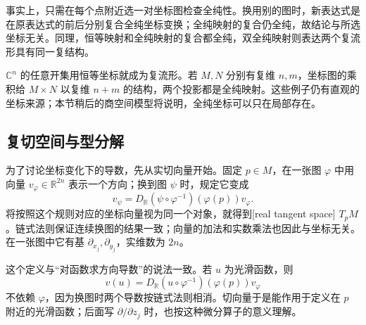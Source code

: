 事实上，只需在每个点附近选一对坐标图检查全纯性。换用别的图时，新表达式是在原表达式的前后分别复合全纯坐标变换；全纯映射的复合仍全纯，故结论与所选坐标无关。同理，恒等映射和全纯映射的复合都全纯，双全纯映射则表达两个复流形具有同一复结构。

\ProseParagraphBreak

\(\mathbb C^n\) 的任意开集用恒等坐标就成为复流形。若 \(M,N\) 分别有复维 \(n,m\)，坐标图的乘积给 \(M\times N\) 以复维 \(n+m\) 的结构，两个投影都是全纯映射。这些例子仍有直观的坐标来源；本节稍后的商空间模型将说明，全纯坐标可以只在局部存在。

\subsection{复切空间与型分解}
\label{b3:subsec:290702}

为了讨论坐标变化下的导数，先从实切向量开始。固定 \(p\in M\)，在一张图 \(\varphi\) 中用向量 \(v_\varphi\in\mathbb R^{2n}\) 表示一个方向；换到图 \(\psi\) 时，规定它变成
\[
 v_\psi=D_{\mathbb R}(\psi\circ\varphi^{-1})(\varphi(p))v_\varphi.
\]
将按照这个规则对应的坐标向量视为同一个对象，就得到[real tangent space] \(T_pM\)。链式法则保证连续换图的结果一致；向量的加法和实数乘法也因此与坐标无关。在一张图中它有基 \(\partial_{x_j},\partial_{y_j}\)，实维数为 \(2n\)。

\ProseParagraphBreak

这个定义与“对函数求方向导数”的说法一致。若 \(u\) 为光滑函数，则
\[
 v(u)=D_{\mathbb R}(u\circ\varphi^{-1})(\varphi(p))v_\varphi
\]
不依赖 \(\varphi\)，因为换图时两个导数按链式法则相消。切向量于是能作用于定义在 \(p\) 附近的光滑函数；后面写 \(\partial/\partial z_j\) 时，也按这种微分算子的意义理解。

